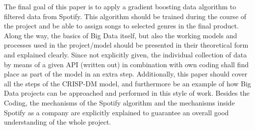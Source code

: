 The final goal of this paper is to apply a gradient boosting data algorithm to filtered data from Spotify. 
This algorithm should be trained during the course of the project and be able to assign songs to selected genres in the final product. 
Along the way, the basics of Big Data itself, but also the working models and processes used in the project/model should be presented 
in their theoretical form and explained clearly. Since not explicitly given, the individual collection of data by means of a given API (written out) 
in combination with own coding shall find place as part of the model in an extra step. 
Additionally, this paper should cover all the steps of the CRISP-DM model, and furthermore be an example of how Big Data projects can be approached 
and performed in this style of work. Besides the Coding, the mechanisms of the Spotify algorithm and the mechanisms inside Spotify as a company are 
explicitly explained to guarantee an overall good understanding of the whole project.

